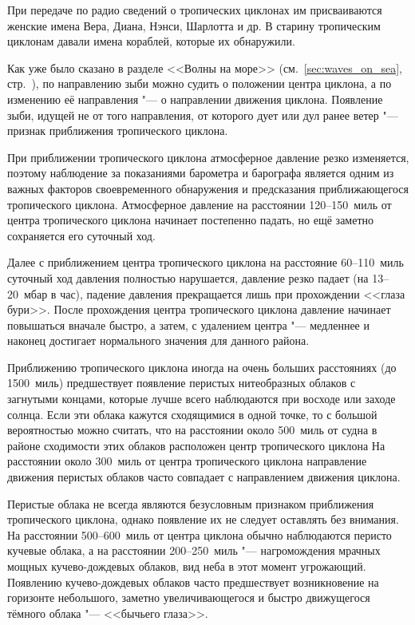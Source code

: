 При передаче по радио сведений о тропических циклонах им присваиваются
женские имена Вера, Диана, Нэнси, Шарлотта и др. В старину тропическим
циклонам давали имена кораблей, которые их обнаружили.

 Как уже было сказано в разделе <<Волны на море>>
(см.~\ref{sec:waves_on_sea}, стр.~\pageref{sec:waves_on_sea}), по
направлению зыби можно судить о положении центра циклона, а по
изменению её направления "--- о направлении движения
циклона. Появление зыби, идущей не от того направления, от которого
дует или дул ранее ветер "--- признак приближения тропического
циклона.

 При приближении тропического циклона атмосферное давление
резко изменяется, поэтому наблюдение за показаниями барометра и
барографа является одним из важных факторов своевременного обнаружения
и предсказания приближающегося тропического циклона. Атмосферное
давление на расстоянии 120--150~миль от центра тропического циклона
начинает постепенно падать, но ещё заметно сохраняется его суточный
ход.

Далее с приближением центра тропического циклона на расстояние
60--110~миль суточный ход давления полностью нарушается, давление
резко падает (на 13--20~мбар в час), падение давления прекращается лишь
при прохождении <<глаза бури>>. После прохождения центра тропического
циклона давление начинает повышаться вначале быстро, а затем, с
удалением центра "--- медленнее и наконец достигает нормального значения
для данного района.

 Приближению тропического циклона иногда на очень больших
расстояниях (до 1500~миль) предшествует появление перистых
нитеобразных облаков с загнутыми концами, которые лучше всего
наблюдаются при восходе или заходе солнца. Если эти облака кажутся
сходящимися в одной точке, то с большой вероятностью можно считать,
что на расстоянии около 500~миль от судна в районе сходимости этих
облаков расположен центр тропического циклона На расстоянии около 300~миль
от центра тропического циклона направление движения перистых
облаков часто совпадает с направлением движения циклона.

Перистые облака не всегда являются безусловным признаком приближения
тропического циклона, однако появление их не следует оставлять без
внимания. На расстоянии 500--600~миль от центра циклона обычно
наблюдаются перисто кучевые облака, а на расстоянии 200--250~миль "---
нагромождения мрачных мощных кучево-дождевых облаков, вид неба в этот
момент угрожающий. Появлению кучево-дождевых облаков часто
предшествует возникновение на горизонте небольшого, заметно
увеличивающегося и быстро движущегося тёмного облака "--- <<бычьего
глаза>>.


